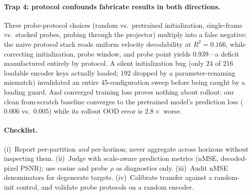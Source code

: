 \paragraph{Trap 4: protocol confounds fabricate results in both directions.}
Three probe-protocol choices (random vs.\ pretrained initialization, single-frame vs.\ stacked probes, probing through the projector) multiply into a false negative: the naive protocol stack reads uniform velocity decodability at $R^{2}{=}0.166$, while correcting initialization, probe window, and probe point yields $0.939$---a deficit manufactured entirely by protocol. A silent initialization bug (only $24$ of $216$ loadable encoder keys actually loaded; $192$ dropped by a parameter-renaming mismatch) invalidated an entire 45-configuration sweep before being caught by a loading guard. And converged training loss proves nothing about rollout: our clean from-scratch baseline converges to the pretrained model's prediction loss ($0.006$ vs.\ $0.005$) while its rollout OOD error is $2.8\times$ worse.

\paragraph{Checklist.}
(i)~Report per-partition \emph{and} per-horizon; never aggregate across horizons without inspecting them. (ii)~Judge with scale-aware prediction metrics (nMSE, decoded-pixel PSNR); use cosine and probe $\rho$ as diagnostics only. (iii)~Audit nMSE denominators for degenerate targets. (iv)~Calibrate transfer against a random-init control, and validate probe protocols on a random encoder.
